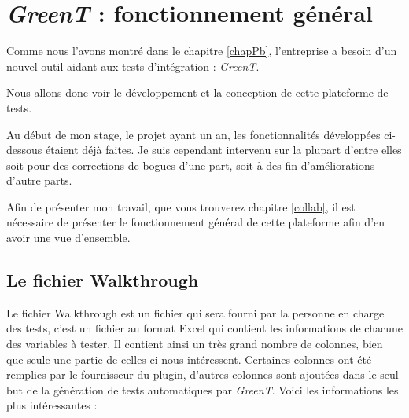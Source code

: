 \chapter{\textit{GreenT} : fonctionnement général}\label{chapGreent}
\putminitoc

Comme nous l'avons montré dans le chapitre \ref{chapPb}, l'entreprise a besoin d'un nouvel outil aidant aux tests d'intégration : \textit{GreenT}. 

Nous allons donc voir le développement et la conception de cette plateforme de tests.

Au début de mon stage, le projet ayant un an, les fonctionnalités développées ci-dessous étaient déjà faites. Je suis cependant intervenu
sur la plupart d'entre elles soit pour des corrections de bogues d'une part, soit à des fin d'améliorations d'autre parts.

Afin de présenter mon travail, que vous trouverez chapitre \ref{collab}, il est nécessaire de présenter le fonctionnement général de
cette plateforme afin d'en avoir une vue d'ensemble.

\section{Le fichier Walkthrough}\label{wt}
Le fichier Walkthrough est un fichier qui sera fourni par la personne en charge des tests, c'est un fichier au format Excel qui contient les informations
de chacune des variables à tester. Il contient ainsi un très grand nombre de colonnes, bien que seule une partie de celles-ci nous
intéressent. Certaines colonnes ont été remplies par le fournisseur du plugin, d'autres colonnes sont ajoutées dans le seul but de la
génération de tests automatiques par \textit{GreenT}. Voici les informations les plus intéressantes : 

